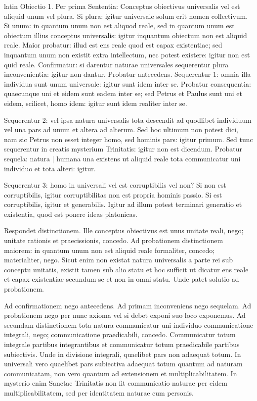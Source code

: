 \begin{otherlanguage*}{latin}
\pstart
 Obiectio 1. Per prima Sententia: Conceptus obiectivus universalis vel est aliquid unum vel plura. Si plura: igitur universale solum erit nomen collectivum. Si unum: in quantum unum non est aliquod reale, sed in quantum unum est obiectum illius conceptus universalis: igitur inquantum obiectum non est aliquid reale. Maior probatur: illud est ens reale quod est capax existentiae; sed inquantum unum non existit extra intellectum, nec potest existere: igitur non est quid reale. Confirmatur: si darentur naturae universales sequerentur plura inconvenientia: igitur non dantur. Probatur antecedens. Sequerentur 1: omnia illa individua sunt unum universale: igitur sunt idem inter se. Probatur consequentia: quaecunque uni et eidem sunt eadem inter se; sed Petrus et Paulus sunt uni et eidem, scilicet, homo idem: igitur sunt idem realiter inter se. 
\pend

\pstart
 Sequerentur 2: vel ipsa natura universalis tota descendit ad quodlibet individuum vel una pars ad unum et altera ad alterum. Sed hoc ultimum non potest dici, nam sic Petrus non esset integer homo, sed hominis pars: igitur primum. Sed tunc sequerentur in creatis mysterium Trinitatis: igitur non est dicendum. Probatur sequela: natura \textnormal{|} humana una existens ut aliquid reale tota communicatur uni individuo et tota alteri: igitur. 
\pend

\pstart
 Sequerentur 3: homo in universali vel est corruptibilis vel non? Si non est corruptibilis, igitur corruptibilitas non est propria hominis passio. Si est corruptibilis, igitur et generabilis. Igitur ad illum potest terminari generatio et existentia, quod est ponere ideas platonicas. 
\pend

\pstart
 Respondet distinctionem. Ille conceptus obiectivus est unus unitate reali, nego; unitate rationis et praecissionis, concedo. Ad probationem distinctionem maiorem: in quantum unum non est aliquid reale formaliter, concedo; materialiter, nego. Sicut enim non existat natura universalis a parte rei sub conceptu unitatis, existit tamen sub alio statu et hoc sufficit ut dicatur ens reale et capax existentiae secundum se et non in omni statu. Unde patet solutio ad probationem. 
\pend

\pstart
 Ad confirmationem nego antecedens. Ad primam inconveniens nego sequelam. Ad probationem nego per nunc axioma vel si debet exponi suo loco exponemus. Ad secundam distinctionem tota natura communicatur uni individuo communicatione integrali, nego; communicatione praedicabili, concedo. Communicatur totum integrale partibus integrantibus et communicatur totum praedicabile partibus subiectivis. Unde in divisione integrali, quaelibet pars non adaequat totum. In universali vero quaelibet pars subiectiva adaequat totum quantum ad naturam communicatam, non vero quantum ad extensionem et multiplicabilitatem. In mysterio enim Sanctae Trinitatis non fit communicatio naturae per eidem multiplicabilitatem, sed per identitatem naturae cum personis. 
\pend


\end{otherlanguage*}
